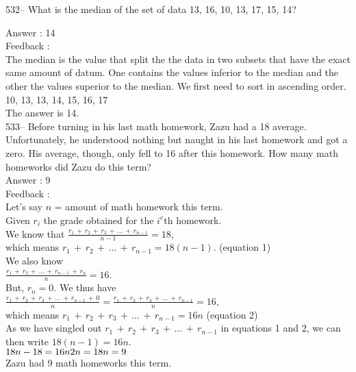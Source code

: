 ﻿\documentclass[letterpaper, 12pt]{article}
\begin{document}
532-- What is the median of the set of data 13, 16, 10, 13, 17,
15, 14?

Answer : 14\\

Feedback :\\
The median is the value that split the the data in two subsets that have the exact same amount of datum. One contains the values inferior to the median and the other the values superior to the median. We first need to sort in ascending order.\\
10, 13, 13, 14, 15, 16, 17 \\
The answer is 14.\\

533-- Before turning in his last math homework, Zazu had a 18 average. Unfortunately, he understood nothing but naught in his last homework and got a zero. His average, though, only fell to 16 after this homework. How many math homeworks did Zazu do this term?\\

Answer : 9\\

Feedback : \\
Let's say $n$ = amount of math homework this term.\\
Given $r_i$ the grade obtained for the $i^{e}$th homework.\\[2mm]
We know that
$\frac{r_{1}\,+\,r_{2}\,+\,r_{3}\,+\,\ldots\,+\,r_{n-1}}{n-1}=18$,\\[2mm]
which means $r_{1}\,+\,r_{2}\,+\,\ldots\,+\,r_{n-1} =18(n-1)$. \qquad
(equation 1)\\[2mm]
We also know \\[2mm]
$\frac{r_{1}\,+\,r_{2}\,+\,\ldots\,+\,r_{n-1}\,+\,r_{n}}{n}=16$.\\[2mm]
But, $r_{n}=0$.  We thus have\\[2mm]
$\frac{r_{1}\,+\,r_{2}\,+\,r_{3}\,+\,\ldots\,+\,r_{n-1}\,+\,0}{n}=\frac{r_{1}\,+\,r_{2}\,+\,r_{3}\,+\,\ldots\,+\,r_{n-1}}{n}=16$,\\[2mm]
which means $r_{1}\,+\,r_{2}\,+\,r_{3}\,+\,\ldots\,+\,r_{n-1}=16n$ \qquad
(equation 2)\\[2mm]
As we have singled out
$r_{1}\,+\,r_{2}\,+\,r_{3}\,+\,\ldots\,+\,r_{n-1}$ in equations 1 and 2,
we can then write $18\left( n-1\right) = 16n$.\\
$18n-18=16n\\
2n=18\\
n=9$\\
Zazu had 9 math homeworks this term.\\
\end{document}
